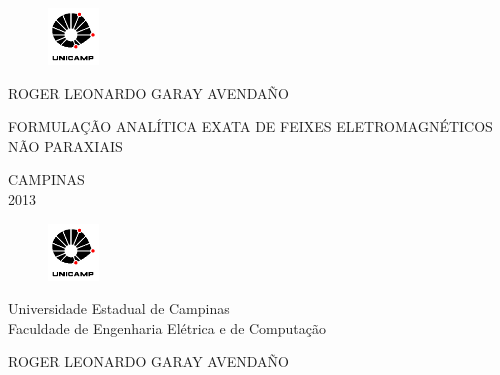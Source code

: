 \begin{figure}
    \includegraphics[width=0.12\textwidth]{./eps/unicamp}
\end{figure}


\vspace*{2.0cm}
\begin{center}
\large ROGER LEONARDO GARAY AVENDAÑO
\end{center}


\vspace*{3.8cm} %

\begin{center}
{\sc \large  FORMULAÇÃO ANALÍTICA EXATA DE FEIXES ELETROMAGNÉTICOS NÃO PARAXIAIS}
\end{center}


\vspace*{3.25cm}


\null \vfill

\begin{center}
CAMPINAS\\2013
\end{center}
\thispagestyle{empty}
\newpage

\pagestyle{plain}
\begin{figure}
    \includegraphics[width=0.12\textwidth]{./eps/unicamp}
\end{figure}

\begin{center}
\large Universidade Estadual de Campinas\\
Faculdade de Engenharia Elétrica e de Computação
\end{center}

\vspace*{1.5cm}
\begin{center}
\large ROGER LEONARDO GARAY AVENDAÑO
\end{center}

